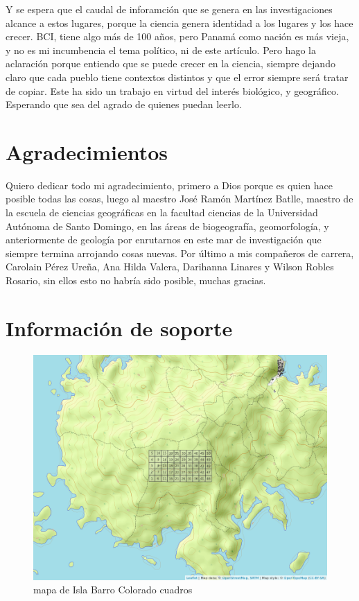 \documentclass[11pt,]{article}
\begin{document}
Y se espera que el caudal de inforamción que se genera en las
investigaciones alcance a estos lugares, porque la ciencia genera
identidad a los lugares y los hace crecer. BCI, tiene algo más de 100
años, pero Panamá como nación es más vieja, y no es mi incumbencia el
tema político, ni de este artículo. Pero hago la aclaración porque
entiendo que se puede crecer en la ciencia, siempre dejando claro que
cada pueblo tiene contextos distintos y que el error siempre será tratar
de copiar. Este ha sido un trabajo en virtud del interés biológico, y
geográfico. Esperando que sea del agrado de quienes puedan leerlo.

\section{Agradecimientos}\label{agradecimientos}

Quiero dedicar todo mi agradecimiento, primero a Dios porque es quien
hace posible todas las cosas, luego al maestro José Ramón Martínez
Batlle, maestro de la escuela de ciencias geográficas en la facultad
ciencias de la Universidad Autónoma de Santo Domingo, en las áreas de
biogeografía, geomorfología, y anteriormente de geología por enrutarnos
en este mar de investigación que siempre termina arrojando cosas nuevas.
Por último a mis compañeros de carrera, Carolain Pérez Ureña, Ana Hilda
Valera, Darihanna Linares y Wilson Robles Rosario, sin ellos esto no
habría sido posible, muchas gracias.

\section{Información de soporte}\label{informaciuxf3n-de-soporte}

\begin{figure}
\centering
\includegraphics[width=1.00000\textwidth]{mapa_cuadros.png}
\caption{mapa de Isla Barro Colorado cuadros\label{fig:bci_map}}
\end{figure}
\end{document}
